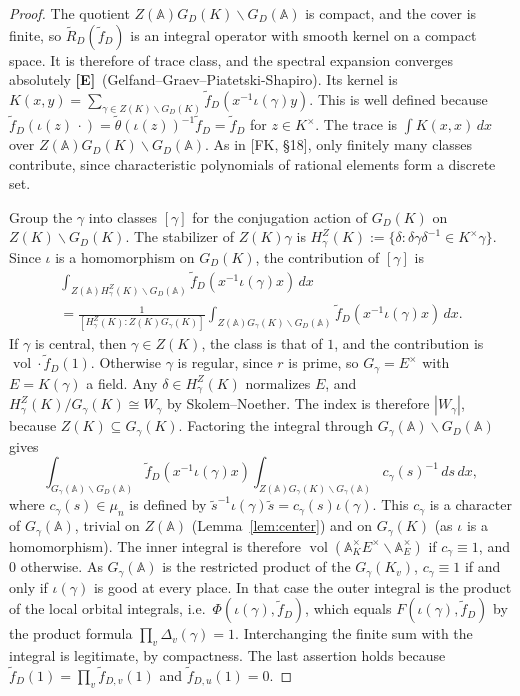 \documentclass[12pt]{article}
\newcommand{\A}{\mathbb{A}}
\newcommand{\vol}{\operatorname{vol}}
\newcommand{\Ev}{\textbf{[E]}}
\theoremstyle{plain}
\theoremstyle{definition}
\begin{document}
\begin{proof}
The quotient $Z(\A)G_D(K)\backslash G_D(\A)$ is compact, and the cover is finite, so $\tilde R_D(\tilde f_D)$ is an integral operator with smooth kernel on a compact space. It is therefore of trace class, and the spectral expansion converges absolutely \Ev\ (Gelfand--Graev--Piatetski-Shapiro). Its kernel is $K(x,y)=\sum_{\gamma\in Z(K)\backslash G_D(K)}\tilde f_D(x^{-1}\iota(\gamma)y)$. This is well defined because $\tilde f_D(\iota(z)\,\cdot)=\tilde\theta(\iota(z))^{-1}\tilde f_D=\tilde f_D$ for $z\in K^\times$. The trace is $\int K(x,x)\,dx$ over $Z(\A)G_D(K)\backslash G_D(\A)$. As in [FK, \S18], only finitely many classes contribute, since characteristic polynomials of rational elements form a discrete set.

Group the $\gamma$ into classes $[\gamma]$ for the conjugation action of $G_D(K)$ on $Z(K)\backslash G_D(K)$. The stabilizer of $Z(K)\gamma$ is $H^Z_\gamma(K):=\{\delta:\delta\gamma\delta^{-1}\in K^\times\gamma\}$. Since $\iota$ is a homomorphism on $G_D(K)$, the contribution of $[\gamma]$ is
\begin{multline*} \int_{Z(\A)H^Z_\gamma(K)\backslash G_D(\A)}\tilde f_D(x^{-1}\iota(\gamma)x)\,dx\\=\frac1{[H^Z_\gamma(K):Z(K)G_\gamma(K)]}\int_{Z(\A)G_\gamma(K)\backslash G_D(\A)}\tilde f_D(x^{-1}\iota(\gamma)x)\,dx. \end{multline*}
If $\gamma$ is central, then $\gamma\in Z(K)$, the class is that of $1$, and the contribution is $\vol\cdot\tilde f_D(1)$. Otherwise $\gamma$ is regular, since $r$ is prime, so $G_\gamma=E^\times$ with $E=K(\gamma)$ a field. Any $\delta\in H^Z_\gamma(K)$ normalizes $E$, and $H^Z_\gamma(K)/G_\gamma(K)\cong W_\gamma$ by Skolem--Noether. The index is therefore $|W_\gamma|$, because $Z(K)\subseteq G_\gamma(K)$. Factoring the integral through $G_\gamma(\A)\backslash G_D(\A)$ gives
\[ \int_{G_\gamma(\A)\backslash G_D(\A)}\tilde f_D(x^{-1}\iota(\gamma)x)\int_{Z(\A)G_\gamma(K)\backslash G_\gamma(\A)}c_\gamma(s)^{-1}\,ds\,dx, \]
where $c_\gamma(s)\in\mu_n$ is defined by $\tilde s^{-1}\iota(\gamma)\tilde s=c_\gamma(s)\iota(\gamma)$. This $c_\gamma$ is a character of $G_\gamma(\A)$, trivial on $Z(\A)$ (Lemma~\ref{lem:center}) and on $G_\gamma(K)$ (as $\iota$ is a homomorphism). The inner integral is therefore $\vol(\A_K^\times E^\times\backslash\A_E^\times)$ if $c_\gamma\equiv1$, and $0$ otherwise. As $G_\gamma(\A)$ is the restricted product of the $G_\gamma(K_v)$, $c_\gamma\equiv1$ if and only if $\iota(\gamma)$ is good at every place. In that case the outer integral is the product of the local orbital integrals, i.e.\ $\Phi(\iota(\gamma),\tilde f_D)$, which equals $F(\iota(\gamma),\tilde f_D)$ by the product formula $\prod_v\Delta_v(\gamma)=1$. Interchanging the finite sum with the integral is legitimate, by compactness. The last assertion holds because $\tilde f_D(1)=\prod_v\tilde f_{D,v}(1)$ and $\tilde f_{D,u}(1)=0$.
\end{proof}
\end{document}
